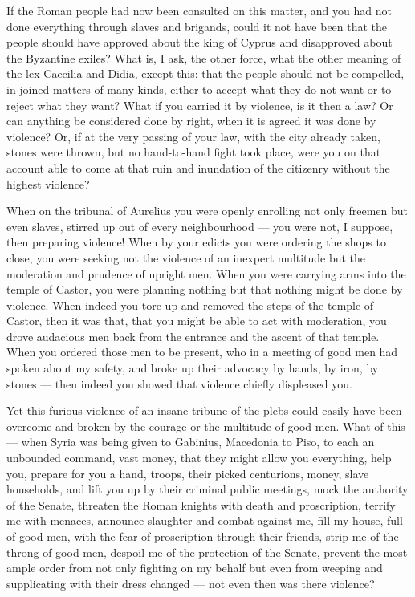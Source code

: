  If the Roman people had now been consulted on this matter, and you had not done everything through slaves and brigands, could it not have been that the people should have approved about the king of Cyprus and disapproved about the Byzantine exiles? What is, I ask, the other force, what the other meaning of the lex Caecilia and Didia, except this: that the people should not be compelled, in joined matters of many kinds, either to accept what they do not want or to reject what they want? What if you carried it by violence, is it then a law? Or can anything be considered done by right, when it is agreed it was done by violence? Or, if at the very passing of your law, with the city already taken, stones were thrown, but no hand-to-hand fight took place, were you on that account able to come at that ruin and inundation of the citizenry without the highest violence?

 When on the tribunal of Aurelius you were openly enrolling not only freemen but even slaves, stirred up out of every neighbourhood --- you were not, I suppose, then preparing violence! When by your edicts you were ordering the shops to close, you were seeking not the violence of an inexpert multitude but the moderation and prudence of upright men. When you were carrying arms into the temple of Castor, you were planning nothing but that nothing might be done by violence. When indeed you tore up and removed the steps of the temple of Castor, then it was that, that you might be able to act with moderation, you drove audacious men back from the entrance and the ascent of that temple. When you ordered those men to be present, who in a meeting of good men had spoken about my safety, and broke up their advocacy by hands, by iron, by stones --- then indeed you showed that violence chiefly displeased you.

 Yet this furious violence of an insane tribune of the plebs could easily have been overcome and broken by the courage or the multitude of good men. What of this --- when Syria was being given to Gabinius, Macedonia to Piso, to each an unbounded command, vast money, that they might allow you everything, help you, prepare for you a hand, troops, their picked centurions, money, slave households, and lift you up by their criminal public meetings, mock the authority of the Senate, threaten the Roman knights with death and proscription, terrify me with menaces, announce slaughter and combat against me, fill my house, full of good men, with the fear of proscription through their friends, strip me of the throng of good men, despoil me of the protection of the Senate, prevent the most ample order from not only fighting on my behalf but even from weeping and supplicating with their dress changed --- not even then was there violence?

